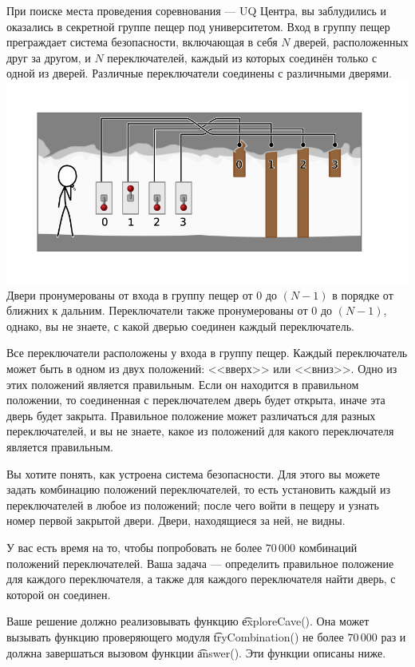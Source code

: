 При поиске места проведения соревнования --- UQ Центра, вы заблудились и оказались в секретной группе пещер под университетом. Вход в группу пещер преграждает система безопасности, включающая в себя $N$ дверей, расположенных друг за другом, и $N$ переключателей, каждый из которых соединён только с одной из дверей. Различные переключатели соединены с различными дверями.
\includegraphics{cave1.png}
Двери пронумерованы от входа в группу пещер от $0$ до $(N - 1)$ в порядке от ближних к дальним. Переключатели также пронумерованы от $0$ до $(N - 1)$, однако, вы не знаете, с какой дверью соединен каждый переключатель.

Все переключатели расположены у входа в группу пещер. Каждый переключатель может быть в одном из двух положений: <<вверх>> или <<вниз>>. Одно из этих положений является правильным. Если он находится в правильном положении, то соединенная с переключателем дверь будет открыта, иначе эта дверь будет закрыта. Правильное положение может различаться для разных переключателей, и вы не знаете, какое из положений для какого переключателя является правильным.

Вы хотите понять, как устроена система безопасности. Для этого вы можете задать комбинацию положений переключателей, то есть установить каждый из переключателей в любое из положений; после чего войти в пещеру и узнать номер первой закрытой двери. Двери, находящиеся за ней, не видны.

У вас есть время на то, чтобы попробовать не более $70\,000$ комбинаций положений переключателей. Ваша задача --- определить правильное положение для каждого переключателя, а также для каждого переключателя найти дверь, с которой он соединен.

Ваше решение должно реализовывать функцию \t{exploreCave()}. Она может вызывать функцию проверяющего модуля \t{tryCombination()} не более $70\,000$ раз и должна завершаться вызовом функции \t{answer()}. Эти функции описаны ниже.

